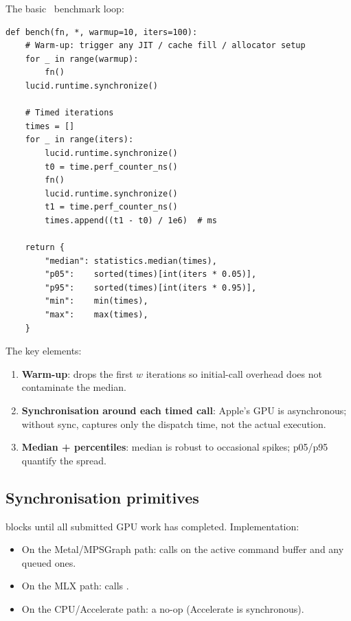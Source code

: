 The basic \Lucid\ benchmark loop:

\begin{lstlisting}[style=lucid,language=LucidPython]
def bench(fn, *, warmup=10, iters=100):
    # Warm-up: trigger any JIT / cache fill / allocator setup
    for _ in range(warmup):
        fn()
    lucid.runtime.synchronize()

    # Timed iterations
    times = []
    for _ in range(iters):
        lucid.runtime.synchronize()
        t0 = time.perf_counter_ns()
        fn()
        lucid.runtime.synchronize()
        t1 = time.perf_counter_ns()
        times.append((t1 - t0) / 1e6)  # ms

    return {
        "median": statistics.median(times),
        "p05":    sorted(times)[int(iters * 0.05)],
        "p95":    sorted(times)[int(iters * 0.95)],
        "min":    min(times),
        "max":    max(times),
    }
\end{lstlisting}

The key elements:
\begin{enumerate}
  \item \textbf{Warm-up}: drops the first $w$ iterations so
    initial-call overhead does not contaminate the median.
  \item \textbf{Synchronisation around each timed call}: Apple's
    GPU is asynchronous; without sync, 
    captures only the dispatch time, not the actual execution.
  \item \textbf{Median + percentiles}: median is robust to
    occasional spikes; p05/p95 quantify the spread.
\end{enumerate}

\subsection{Synchronisation primitives}
\label{ssec:perf_methodology:sync}

 blocks until all submitted
GPU work has completed. Implementation:

\begin{itemize}
  \item On the Metal/MPSGraph path: calls
     on the active
    command buffer and any queued ones.
  \item On the MLX path: calls .
  \item On the CPU/Accelerate path: a no-op (Accelerate is
    synchronous).
\end{itemize}

